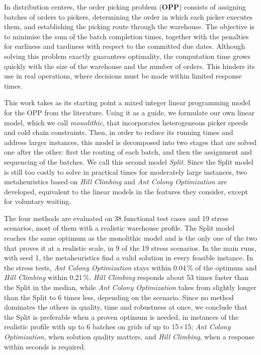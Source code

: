 In distribution centres, the order picking problem ({\bf OPP}) consists of assigning batches of orders to pickers, determining the order
in which each picker executes them, and establishing the picking route through the warehouse. The objective is to minimise the sum of the
batch completion times, together with the penalties for earliness and tardiness with respect to the committed due dates. Although solving this
problem exactly guarantees optimality, the computation time grows quickly with the size of the warehouse and the number of orders. This
hinders its use in real operations, where decisions must be made within limited response times.

This work takes as its starting point a mixed integer linear programming model for the OPP from the literature. Using it as a guide, we
formulate our own linear model, which we call {\em monolithic}, that incorporates heterogeneous picker speeds and cold chain constraints.
Then, in order to reduce its running times and address larger instances, this model is decomposed into two stages that are solved one after
the other: first the routing of each batch, and then the assignment and sequencing of the batches. We call this second model {\em Split}.
Since the Split model is still too costly to solve in practical times for moderately large instances, two metaheuristics based on
{\em Hill Climbing} and {\em Ant Colony Optimization} are developed, equivalent to the linear models in the features they consider, except for voluntary waiting.

The four methods are evaluated on 38 functional test cases and 19 stress scenarios, most of them with a realistic warehouse profile. The
Split model reaches the same optimum as the monolithic model and is the only one of the two that proves it at a realistic scale, in 9 of
the 19 stress scenarios. In the main runs, with seed 1, the metaheuristics find a valid solution in every
feasible instance. In the stress tests, {\em Ant Colony Optimization}
stays within 0.04\,\% of the optimum and {\em Hill Climbing} within 0.21\,\%. {\em Hill Climbing} responds about 53 times faster
than the Split in the median, while {\em Ant Colony Optimization} takes from slightly longer than the Split to 6 times less,
depending on the scenario. Since no method dominates the others in quality, time and robustness at once, we conclude that the Split is preferable when
a proven optimum is needed, in instances of the realistic profile with up to 6 batches on grids of up to 15×15; {\em Ant Colony Optimization}, when solution quality
matters, and {\em Hill Climbing}, when a response within seconds is required.
